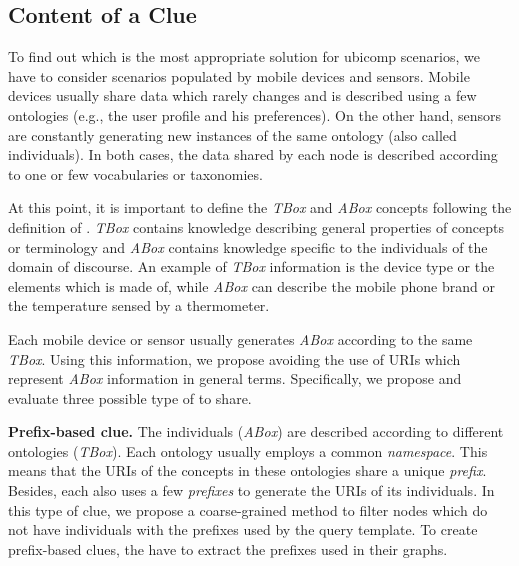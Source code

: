 \subsection{Content of a Clue}
To find out which is the most appropriate solution for \ac{ubicomp} scenarios, we have to consider scenarios populated by mobile devices and sensors. %
Mobile devices usually share data which rarely changes and is described using a few ontologies (e.g., the user profile and his preferences).
On the other hand, sensors are constantly generating new instances of the same ontology (also called individuals).
In both cases, the data shared by each node is described according to one or few vocabularies or taxonomies.

At this point, it is important to define the \emph{TBox} and \emph{ABox} concepts following the definition of \citet{nardi2003introduction}.
\emph{TBox} contains knowledge describing general properties of concepts or terminology and
\emph{ABox} contains knowledge specific to the individuals of the domain of discourse.
An example of \emph{TBox} information is the device type or the elements which is made of,
while \emph{ABox} can describe the mobile phone brand or the temperature sensed by a thermometer.

Each mobile device or sensor usually generates \emph{ABox} according to the same \emph{TBox}.
Using this information, we propose avoiding the use of URIs which represent \emph{ABox} information in general terms.
Specifically, we propose and evaluate three possible type of \clues{} to share.

\medskip

\noindent\textbf{Prefix-based clue.}
The individuals (\emph{ABox}) are described according to different ontologies (\emph{TBox}).
Each ontology usually employs a common \emph{namespace}.
This means that the URIs of the concepts in these ontologies share a unique \emph{prefix}.
Besides, each \provider{} also uses a few \emph{prefixes} to generate the URIs of its individuals.
In this type of clue, we propose a coarse-grained method to filter nodes which do not have individuals with the prefixes used by the query template.
To create prefix-based clues, the \providers{} have to extract the prefixes used in their graphs. %

